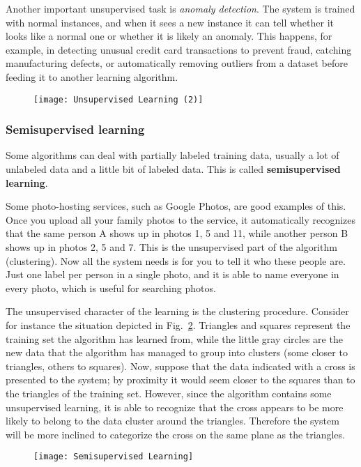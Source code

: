 Another important unsupervised task is \emph{anomaly detection}. The system is trained with normal instances, and when it sees a new instance it can tell whether it looks like a normal one or whether it is likely an anomaly. This happens, for example, in detecting unusual credit card transactions to prevent fraud, catching manufacturing defects, or automatically removing outliers from a dataset before feeding it to another learning algorithm.
\begin{figure}[h!t]
\centering
\texttt{[image: Unsupervised Learning (2)]}
\caption{}\label{UnsupervisedLearning2}
\end{figure}
\subsubsection{Semisupervised learning}
Some algorithms can deal with partially labeled training data, usually a lot of unlabeled data and a little bit of labeled data. This is called \textbf{semisupervised learning}.

Some photo-hosting services, such as Google Photos, are good examples of this. Once you upload all your family photos to the service, it automatically recognizes that the same person A shows up in photos 1, 5 and 11, while another person B shows up in photos 2, 5 and 7. This is the unsupervised part of the algorithm (clustering). Now all
the system needs is for you to tell it who these people are. Just one label per person in a single photo, and it is able to name everyone in every photo, which is useful for searching photos.

The unsupervised character of the learning is the clustering procedure. Consider for instance the situation depicted in Fig.~\ref{SemisupervisedLearning}. Triangles and squares represent the training set the algorithm has learned from, while the little gray circles are the new data that the algorithm has managed to group into clusters (some closer to triangles, others to squares). Now, suppose that the data indicated with a cross is presented to the system; by proximity it would seem closer to the squares than to the triangles of the training set. However, since the algorithm contains some unsupervised learning, it is able to recognize that the cross appears to be more likely to belong to the data cluster around the triangles. Therefore the system will be more inclined to categorize the cross on the same plane as the triangles.
\begin{figure}[h!t]
\centering
\texttt{[image: Semisupervised Learning]}
\caption{}\label{SemisupervisedLearning}
\end{figure}
